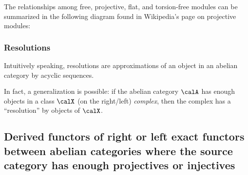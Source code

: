 The relationships among free, projective, flat, and torsion-free modules can be summarized in the following diagram found in Wikipedia's page on projective modules:

\begin{center}
\end{center}

\subsubsection{Resolutions}

Intuitively speaking, resolutions are approximations of an object in an abelian category by acyclic sequences.






In fact, a generalization is possible: if the abelian category $\calA$ has enough objects in a class $\calX$ (on the right/left) \emph{complex}, then the complex has a ``resolution'' by objects of $\calX$. 






\subsection{Derived functors of right or left exact functors between abelian categories where the source category has enough projectives or injectives}



